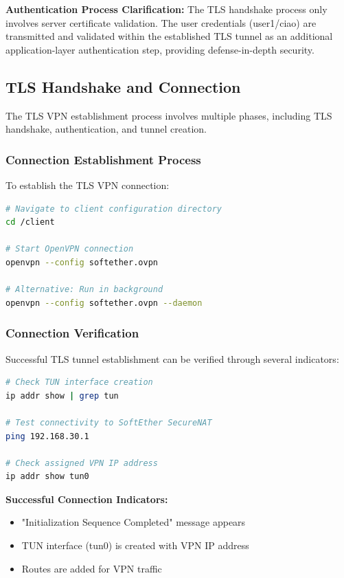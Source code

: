 \noindent
\textbf{Authentication Process Clarification:} The TLS handshake process only involves server certificate validation. The user credentials (user1/ciao) are transmitted and validated within the established TLS tunnel as an additional application-layer authentication step, providing defense-in-depth security.

\subsection{TLS Handshake and Connection}

The TLS VPN establishment process involves multiple phases, including TLS handshake, authentication, and tunnel creation.

\subsubsection{Connection Establishment Process}

To establish the TLS VPN connection:

\begin{lstlisting}[language=bash]
# Navigate to client configuration directory
cd /client

# Start OpenVPN connection
openvpn --config softether.ovpn

# Alternative: Run in background
openvpn --config softether.ovpn --daemon
\end{lstlisting}

\subsubsection{Connection Verification}

Successful TLS tunnel establishment can be verified through several indicators:

\begin{lstlisting}[language=bash]
# Check TUN interface creation
ip addr show | grep tun

# Test connectivity to SoftEther SecureNAT
ping 192.168.30.1

# Check assigned VPN IP address
ip addr show tun0
\end{lstlisting}

\noindent
\textbf{Successful Connection Indicators:}
\begin{itemize}
    \item "Initialization Sequence Completed" message appears
    \item TUN interface (tun0) is created with VPN IP address
    \item Routes are added for VPN traffic
\end{itemize}

